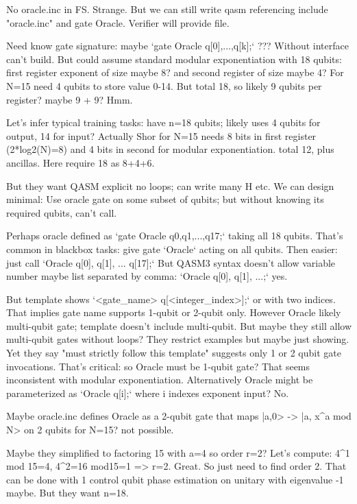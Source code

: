 \begin{decodedreasoningpanel}
No oracle.inc in FS. Strange. But we can still write qasm referencing include "oracle.inc" and gate Oracle. Verifier will provide file.

Need know gate signature: maybe `gate Oracle q[0],...,q[k];` ??? Without interface can't build. But could assume standard modular exponentiation with 18 qubits: first register exponent of size maybe 8? and second register of size maybe 4? For N=15 need 4 qubits to store value 0-14. But total 18, so likely 9 qubits per register? maybe 9 + 9? Hmm.

Let's infer typical training tasks: have n=18 qubits; likely uses 4 qubits for output, 14 for input? Actually Shor for N=15 needs 8 bits in first register (2*log2(N)=8) and 4 bits in second for modular exponentiation. total 12, plus ancillas. Here require 18 as 8+4+6.

But they want QASM explicit no loops; can write many H etc. We can design minimal: Use oracle gate on some subset of qubits; but without knowing its required qubits, can't call.

Perhaps oracle defined as `gate Oracle q0,q1,...,q17;` taking all 18 qubits. That's common in blackbox tasks: give gate `Oracle` acting on all qubits. Then easier: just call `Oracle q[0], q[1], ... q[17];` But QASM3 syntax doesn't allow variable number maybe list separated by comma: `Oracle q[0], q[1], ...;` yes.

But template shows `<gate\_name> q[<integer\_index>];` or with two indices. That implies gate name supports 1-qubit or 2-qubit only. However Oracle likely multi-qubit gate; template doesn't include multi-qubit. But maybe they still allow multi-qubit gates without loops? They restrict examples but maybe just showing. Yet they say "must strictly follow this template" suggests only 1 or 2 qubit gate invocations. That's critical: so Oracle must be 1-qubit gate? That seems inconsistent with modular exponentiation. Alternatively Oracle might be parameterized as `Oracle q[i];` where i indexes exponent input? No.

Maybe oracle.inc defines Oracle as a 2-qubit gate that maps |a,0> -> |a, x\textasciicircum{}a mod N> on 2 qubits for N=15? not possible.

Maybe they simplified to factoring 15 with a=4 so order r=2? Let's compute: 4\textasciicircum{}1 mod 15=4, 4\textasciicircum{}2=16 mod15=1 => r=2. Great. So just need to find order 2. That can be done with 1 control qubit phase estimation on unitary with eigenvalue -1 maybe. But they want n=18.


\end{decodedreasoningpanel}
